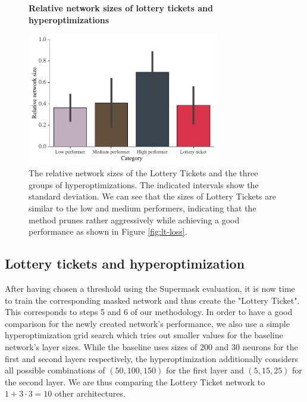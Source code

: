 \documentclass[12pt,final,twoside]{article}
\theoremstyle{plain}
\theoremstyle{definition}
\theoremstyle{remark}
\theoremstyle{named}
\begin{document}
\begin{figure}[h]
  \centering
  \textbf{Relative network sizes of lottery tickets and hyperoptimizations}\par\medskip
  \includegraphics[width=0.75\textwidth]{plots/lt-size.pdf}
  \caption{The relative network sizes of the Lottery Tickets and the three groups of hyperoptimizations. The indicated intervals show the standard deviation. We can see that the sizes of Lottery Tickets are similar to the low and medium performers, indicating that the method prunes rather aggressively while achieving a good performance as shown in Figure \ref{fig:lt-loss}.}
  \label{fig:lt-size}
\end{figure}

\subsection{Lottery tickets and hyperoptimization}
After having chosen a threshold using the Supermask evaluation, it is now time to train the corresponding masked network and thus create the "Lottery Ticket". This corresponds to steps 5 and 6 of our methodology. In order to have a good comparison for the newly created network's performance, we also use a simple hyperoptimization grid search which tries out smaller values for the baseline network's layer sizes. While the baseline uses sizes of $200$ and $30$ neurons for the first and second layers respectively, the hyperoptimization additionally considers all possible combinations of $(50, 100, 150)$ for the first layer and $(5, 15, 25)$ for the second layer. We are thus comparing the Lottery Ticket network to $1 + 3 \cdot 3 = 10$ other architectures.
\end{document}

